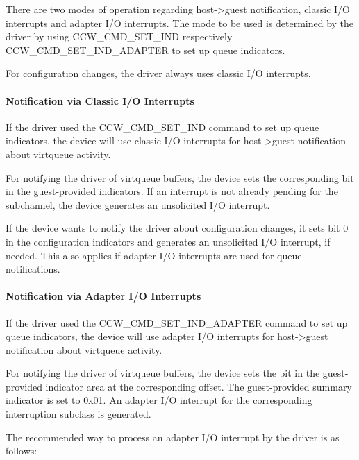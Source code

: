 There are two modes of operation regarding host->guest notification,
classic I/O interrupts and adapter I/O interrupts. The mode to be
used is determined by the driver by using CCW_CMD_SET_IND respectively
CCW_CMD_SET_IND_ADAPTER to set up queue indicators.

For configuration changes, the driver always uses classic I/O
interrupts.

\paragraph{Notification via Classic I/O Interrupts}\label{sec:Virtio Transport Options / Virtio over channel I/O / Device Operation / Host->Guest Notification / Notification via Classic I/O Interrupts}

If the driver used the CCW_CMD_SET_IND command to set up queue
indicators, the device will use classic I/O interrupts for
host->guest notification about virtqueue activity.

For notifying the driver of virtqueue buffers, the device sets the
corresponding bit in the guest-provided indicators. If an
interrupt is not already pending for the subchannel, the device
generates an unsolicited I/O interrupt.

If the device wants to notify the driver about configuration
changes, it sets bit 0 in the configuration indicators and
generates an unsolicited I/O interrupt, if needed. This also
applies if adapter I/O interrupts are used for queue notifications.

\paragraph{Notification via Adapter I/O Interrupts}\label{sec:Virtio Transport Options / Virtio over channel I/O / Device Operation / Host->Guest Notification / Notification via Adapter I/O Interrupts}

If the driver used the CCW_CMD_SET_IND_ADAPTER command to set up
queue indicators, the device will use adapter I/O interrupts for
host->guest notification about virtqueue activity.

For notifying the driver of virtqueue buffers, the device sets the
bit in the guest-provided indicator area at the corresponding offset.
The guest-provided summary indicator is set to 0x01. An adapter I/O
interrupt for the corresponding interruption subclass is generated.

The recommended way to process an adapter I/O interrupt by the driver
is as follows:

